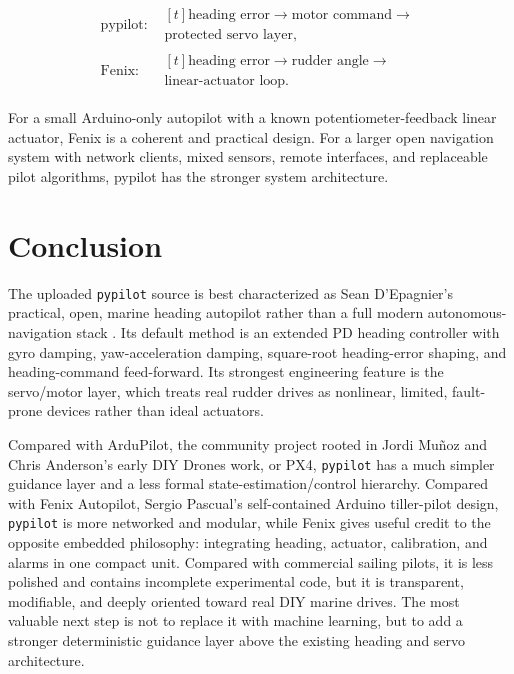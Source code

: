 \documentclass[10pt,twocolumn]{article}
\begin{document}
{\small
\[
\begin{array}{ll}
\text{pypilot:} &
\begin{gathered}[t]
\text{heading error}\to\text{motor command}\to{}\\
\text{protected servo layer},
\end{gathered}
\\[6pt]
\text{Fenix:} &
\begin{gathered}[t]
\text{heading error}\to\text{rudder angle}\to{}\\
\text{linear-actuator loop}.
\end{gathered}
\end{array}
\]
}

For a small Arduino-only autopilot with a known potentiometer-feedback
linear actuator, Fenix is a coherent and practical design.  For a larger
open navigation system with network clients, mixed sensors, remote
interfaces, and replaceable pilot algorithms, pypilot has the stronger
system architecture.

\section{Conclusion}

The uploaded \texttt{pypilot} source is best characterized as Sean D'Epagnier's
practical, open, marine heading autopilot rather than a full modern autonomous-navigation
stack \cite{pypilot-author}.  Its default
method is an extended PD heading controller with gyro damping, yaw-acceleration damping,
square-root heading-error shaping, and heading-command feed-forward.  Its strongest
engineering feature is the servo/motor layer, which treats real rudder drives as nonlinear,
limited, fault-prone devices rather than ideal actuators.

Compared with ArduPilot, the community project rooted in Jordi Mu\~noz and Chris
Anderson's early DIY Drones work, or PX4, \texttt{pypilot} has a much simpler guidance
layer and a less formal state-estimation/control hierarchy.  Compared with Fenix
Autopilot, Sergio Pascual's self-contained Arduino tiller-pilot design, \texttt{pypilot}
is more networked and modular, while Fenix gives useful credit to the opposite embedded
philosophy: integrating heading, actuator, calibration, and alarms in one compact unit.
Compared with commercial sailing pilots,
it is less polished and contains incomplete experimental code, but it is transparent,
modifiable, and deeply oriented toward real DIY marine drives.  The most valuable next step
is not to replace it with machine learning, but to add a stronger deterministic guidance
layer above the existing heading and servo architecture.
\end{document}
